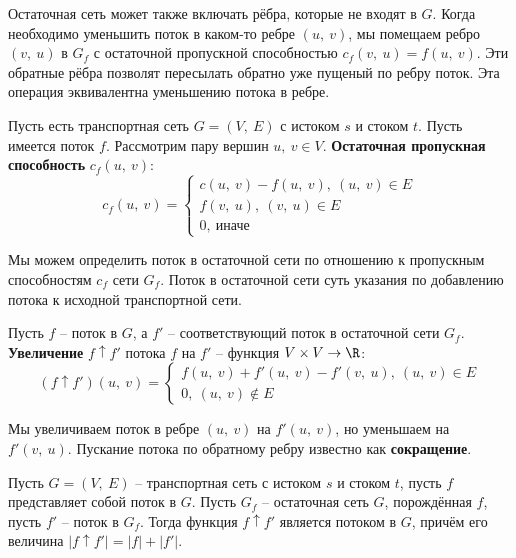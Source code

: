 \documentclass[a4paper,12pt]{article}
\begin{document}
Остаточная сеть может также включать рёбра, которые не входят в $G$. Когда необходимо уменьшить поток в каком-то ребре $(u,\ v)$, мы помещаем ребро $(v,\ u)$ в $G_f$ с остаточной пропускной способностью $c_f(v,\ u) = f(u,\ v)$. Эти обратные рёбра позволят пересылать обратно уже пущеный по ребру поток. Эта операция эквивалентна уменьшению потока в ребре.

\begin{definition}
    Пусть есть транспортная сеть $G = (V,\ E)$ с истоком $s$ и стоком $t$. Пусть имеется поток $f$. Рассмотрим пару вершин $u,\ v \in V$. \textbf{Остаточная пропускная способность} $c_f(u,\ v)$:\[c_f(u,\ v) = \begin{cases}c(u,\ v) - f(u,\ v),\ (u,\ v) \in E\\ f(v,\ u),\ (v,\ u) \in E\\ 0,\ \text{иначе}\end{cases}\]
\end{definition}

Мы можем определить поток в остаточной сети по отношению к пропускным способностям $c_f$ сети $G_f$. Поток в остаточной сети суть указания по добавлению потока к исходной транспортной сети.

\begin{definition}
    Пусть $f$ -- поток в $G$, а $f'$ -- соответствующий поток в остаточной сети $G_f$. \textbf{Увеличение} $f\uparrow f'$ потока $f$ на $f'$ -- функция $V\times V \to \R$: \[(f\uparrow f')(u,\ v) = \begin{cases} f(u,\ v) + f'(u,\ v) - f'(v,\ u),\ (u,\ v) \in E\\ 0,\ (u,\ v) \notin E\end{cases}\]
    
    Мы увеличиваем поток в ребре $(u,\ v)$ на $f'(u,\ v)$, но уменьшаем на $f'(v,\ u)$. Пускание потока по обратному ребру известно как \textbf{сокращение}.
\end{definition}

\begin{fulllemma}
Пусть $G = (V,\ E)$ -- транспортная сеть с истоком $s$ и стоком $t$, пусть $f$ представляет собой поток в $G$. Пусть $G_f$ -- остаточная сеть $G$, порождённая $f$, пусть $f'$ -- поток в $G_f$. Тогда функция $f\uparrow f'$ является потоком в $G$, причём его величина $|f\uparrow f'| = |f| + |f'|$.
\end{fulllemma}
\end{document}
